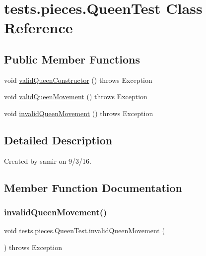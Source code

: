 \hypertarget{classtests_1_1pieces_1_1_queen_test}{}\section{tests.\+pieces.\+Queen\+Test Class Reference}
\label{classtests_1_1pieces_1_1_queen_test}
\subsection*{Public Member Functions}
\begin{DoxyCompactItemize}
\item 
void \hyperlink{classtests_1_1pieces_1_1_queen_test_ab765f13237fea1159b5830124489e0d0}{valid\+Queen\+Constructor} ()  throws Exception 
\item 
void \hyperlink{classtests_1_1pieces_1_1_queen_test_a286f0f2d69087f9fbeb0cb738c9768c5}{valid\+Queen\+Movement} ()  throws Exception 
\item 
void \hyperlink{classtests_1_1pieces_1_1_queen_test_aabc4a6db47aad3d5e71c245e146e1dee}{invalid\+Queen\+Movement} ()  throws Exception 
\end{DoxyCompactItemize}


\subsection{Detailed Description}
Created by samir on 9/3/16. 

\subsection{Member Function Documentation}
\hypertarget{classtests_1_1pieces_1_1_queen_test_aabc4a6db47aad3d5e71c245e146e1dee}{}\label{classtests_1_1pieces_1_1_queen_test_aabc4a6db47aad3d5e71c245e146e1dee} 
\subsubsection{\texorpdfstring{invalid\+Queen\+Movement()}{invalidQueenMovement()}}
{\footnotesize\ttfamily void tests.\+pieces.\+Queen\+Test.\+invalid\+Queen\+Movement (\begin{DoxyParamCaption}{ }\end{DoxyParamCaption}) throws Exception}

